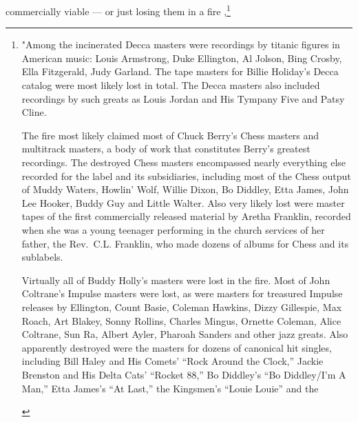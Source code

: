 \documentclass{article}
\begin{document}
commercially viable --- or just losing them in a fire \cite{rosenDayMusicBurned2019},\footnote{\begin{leftbar}  "Among the incinerated Decca masters were recordings by titanic
  figures in American music: Louis Armstrong, Duke Ellington, Al Jolson,
  Bing Crosby, Ella Fitzgerald, Judy Garland. The tape masters for
  Billie Holiday's Decca catalog were most likely lost in total. The
  Decca masters also included recordings by such greats as Louis Jordan
  and His Tympany Five and Patsy Cline.

  The fire most likely claimed most of Chuck Berry's Chess masters and
  multitrack masters, a body of work that constitutes Berry's greatest
  recordings. The destroyed Chess masters encompassed nearly everything
  else recorded for the label and its subsidiaries, including most of
  the Chess output of Muddy Waters, Howlin' Wolf, Willie Dixon, Bo
  Diddley, Etta James, John Lee Hooker, Buddy Guy and Little Walter.
  Also very likely lost were master tapes of the first commercially
  released material by Aretha Franklin, recorded when she was a young
  teenager performing in the church services of her father, the
  Rev.~C.L. Franklin, who made dozens of albums for Chess and its
  sublabels.

  Virtually all of Buddy Holly's masters were lost in the fire. Most of
  John Coltrane's Impulse masters were lost, as were masters for
  treasured Impulse releases by Ellington, Count Basie, Coleman Hawkins,
  Dizzy Gillespie, Max Roach, Art Blakey, Sonny Rollins, Charles Mingus,
  Ornette Coleman, Alice Coltrane, Sun Ra, Albert Ayler, Pharoah Sanders
  and other jazz greats. Also apparently destroyed were the masters for
  dozens of canonical hit singles, including Bill Haley and His Comets'
  ``Rock Around the Clock,'' Jackie Brenston and His Delta Cats'
  ``Rocket 88,'' Bo Diddley's ``Bo Diddley/I'm A Man,'' Etta James's
  ``At Last,'' the Kingsmen's ``Louie Louie'' and the


\end{leftbar}}
\end{document}

